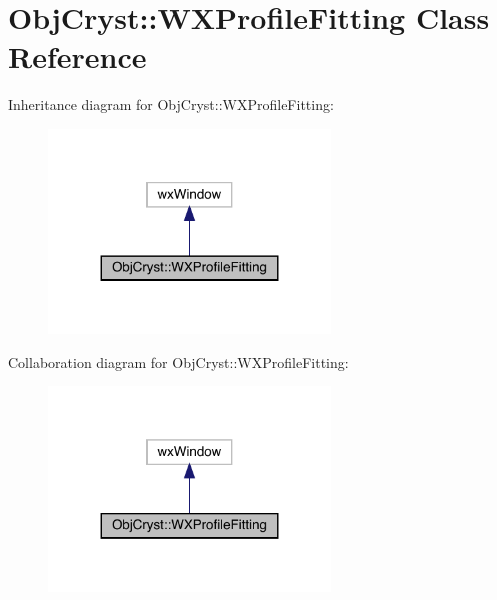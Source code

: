 \hypertarget{class_obj_cryst_1_1_w_x_profile_fitting}{}\section{Obj\+Cryst\+::W\+X\+Profile\+Fitting Class Reference}
\label{class_obj_cryst_1_1_w_x_profile_fitting}


Inheritance diagram for Obj\+Cryst\+::W\+X\+Profile\+Fitting\+:
\nopagebreak
\begin{figure}[H]
\begin{center}
\leavevmode
\includegraphics[width=212pt]{class_obj_cryst_1_1_w_x_profile_fitting__inherit__graph}
\end{center}
\end{figure}


Collaboration diagram for Obj\+Cryst\+::W\+X\+Profile\+Fitting\+:
\nopagebreak
\begin{figure}[H]
\begin{center}
\leavevmode
\includegraphics[width=212pt]{class_obj_cryst_1_1_w_x_profile_fitting__coll__graph}
\end{center}
\end{figure}
